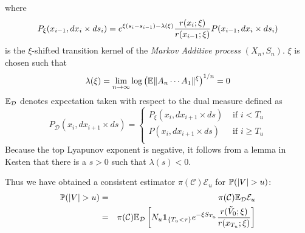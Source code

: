 \documentclass{article}
\theoremstyle{remark}
\begin{document}
where
\[
P_\xi(x_{i-1}, dx_i \times ds_i) = e^{\xi(s_i - s_{i-1}) -
  \lambda(\xi)} {r(x_i; \xi) \over r(x_{i-1}; \xi)} P(x_{i-1}, dx_i
\times ds_i)
\]
is the $\xi$-shifted transition kernel of the {\it Markov Additive
  process} $(X_n, S_n)$. $\xi$ is chosen such that 
\[
\lambda(\xi) = \lim_{n \to \infty} \log \left(
\E \|A_n \cdots A_1\|^\xi
\right)^{1/n} = 0
\]
$\E_{\mathcal D}$ denotes expectation taken with respect to the dual
measure defined as
\[
P_{\mathcal D} (x_i, dx_{i+1} \times ds) = \left\{
  \begin{array}{ll}
    P_\xi (x_i, dx_{i+1} \times ds) & \text{ if } i < T_u \\
    P(x_i, dx_{i+1} \times ds) & \text{ if } i \geq T_u \\
  \end{array}
\right.
\]
Because the top Lyapunov exponent is negative, it follows from a lemma
in Kesten \cite{Kesten1973} that there is a $s > 0$ such that
$\lambda(s) < 0$.

Thus we have obtained a consistent estimator
$\pi(\mathcal C)\mathcal E_u$ for $\P(|V| > u)$:
\begin{eqnarray*}
\P(|V| > u) &=& \pi(\mathcal C) \E_{\mathcal D} \mathcal E_u \\
&=& \pi(\mathcal C) \E_{\mathcal D} \left[
  N_u \1{T_u < \tau} e^{-\xi S_{T_u}} {r(\tilde V_0; \xi)
    \over r(x_{T_u}; \xi)}
\right]
\end{eqnarray*}
\end{document}
